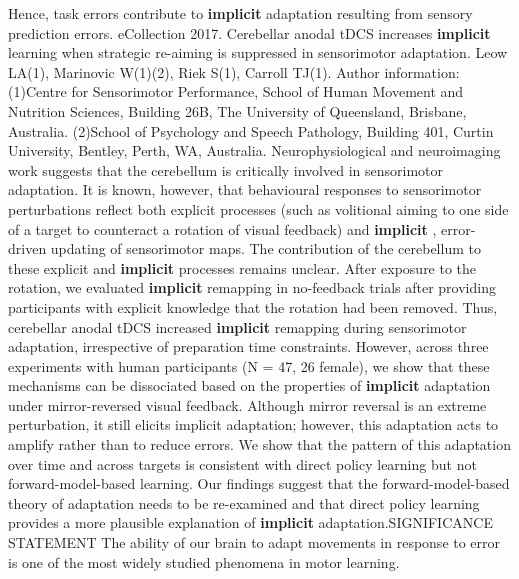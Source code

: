 \documentclass[11pt]{article}
\begin{document}
\newline  [  19  ]   Hence, task errors contribute to   \textbf {  implicit  }   adaptation resulting from  sensory prediction errors.
\newline  [  20  ]  eCollection 2017.  Cerebellar anodal tDCS increases   \textbf {  implicit  }   learning when strategic re-aiming is  suppressed in sensorimotor adaptation.  Leow LA(1), Marinovic W(1)(2), Riek S(1), Carroll TJ(1).  Author information: (1)Centre for Sensorimotor Performance, School of Human Movement and Nutrition  Sciences, Building 26B, The University of Queensland, Brisbane, Australia. (2)School of Psychology and Speech Pathology, Building 401, Curtin University,  Bentley, Perth, WA, Australia.  Neurophysiological and neuroimaging work suggests that the cerebellum is  critically involved in sensorimotor adaptation.
\newline  [  21  ]   It is known, however, that behavioural responses to  sensorimotor perturbations reflect both explicit processes (such as volitional  aiming to one side of a target to counteract a rotation of visual feedback) and    \textbf {  implicit  }  , error-driven updating of sensorimotor maps.
\newline  [  22  ]   The contribution of the  cerebellum to these explicit and   \textbf {  implicit  }   processes remains unclear.
\newline  [  23  ]   After exposure to the rotation, we evaluated   \textbf {  implicit  }    remapping in no-feedback trials after providing participants with explicit  knowledge that the rotation had been removed.
\newline  [  24  ]   Thus, cerebellar  anodal tDCS increased   \textbf {  implicit  }   remapping during sensorimotor adaptation,  irrespective of preparation time constraints.
\newline  [  25  ]   However, across three experiments with human participants  (N = 47, 26 female), we show that these mechanisms can be dissociated based on  the properties of   \textbf {  implicit  }   adaptation under mirror-reversed visual feedback.  Although mirror reversal is an extreme perturbation, it still elicits implicit  adaptation; however, this adaptation acts to amplify rather than to reduce  errors.
\newline  [  26  ]   We show that the pattern of this adaptation over time and across targets  is consistent with direct policy learning but not forward-model-based learning.  Our findings suggest that the forward-model-based theory of adaptation needs to  be re-examined and that direct policy learning provides a more plausible  explanation of   \textbf {  implicit  }   adaptation.SIGNIFICANCE STATEMENT The ability of our  brain to adapt movements in response to error is one of the most widely studied  phenomena in motor learning.
\end{document}
